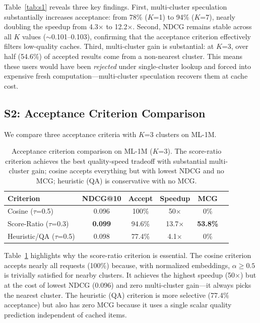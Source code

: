 \documentclass{article}
\begin{document}
Table~\ref{tab:s1} reveals three key findings. First, multi-cluster speculation substantially increases acceptance: from 78\% ($K$=1) to 94\% ($K$=7), nearly doubling the speedup from 4.3$\times$ to 12.2$\times$. Second, NDCG remains stable across all $K$ values ($\sim$0.101--0.103), confirming that the acceptance criterion effectively filters low-quality caches. Third, multi-cluster gain is substantial: at $K$=3, over half (54.6\%) of accepted results come from a non-nearest cluster. This means these users would have been \emph{rejected} under single-cluster lookup and forced into expensive fresh computation---multi-cluster speculation recovers them at cache cost.

\subsection{S2: Acceptance Criterion Comparison}
\label{sec:exp_s2}

We compare three acceptance criteria with $K$=3 clusters on ML-1M.

\begin{table}[t]
\centering
\caption{Acceptance criterion comparison on ML-1M ($K$=3). The score-ratio criterion achieves the best quality-speed tradeoff with substantial multi-cluster gain; cosine accepts everything but with lowest NDCG and no MCG; heuristic (QA) is conservative with no MCG.}
\label{tab:s2}
\small
\begin{tabular}{lccccc}
\toprule
\textbf{Criterion} & \textbf{NDCG@10} & \textbf{Accept} & \textbf{Speedup} & \textbf{MCG} \\
\midrule
Cosine ($\tau$=0.5) & 0.096 & 100\% & 50$\times$ & 0\% \\
Score-Ratio ($\tau$=0.3) & \textbf{0.099} & 94.6\% & 13.7$\times$ & \textbf{53.8\%} \\
Heuristic/QA ($\tau$=0.5) & 0.098 & 77.4\% & 4.1$\times$ & 0\% \\
\bottomrule
\end{tabular}
\end{table}

Table~\ref{tab:s2} highlights why the score-ratio criterion is essential. The cosine criterion accepts nearly all requests (100\%) because, with normalized embeddings, $\alpha \geq 0.5$ is trivially satisfied for nearby clusters. It achieves the highest speedup (50$\times$) but at the cost of lowest NDCG (0.096) and zero multi-cluster gain---it always picks the nearest cluster. The heuristic (QA) criterion is more selective (77.4\% acceptance) but also has zero MCG because it uses a single scalar quality prediction independent of cached items.
\end{document}
